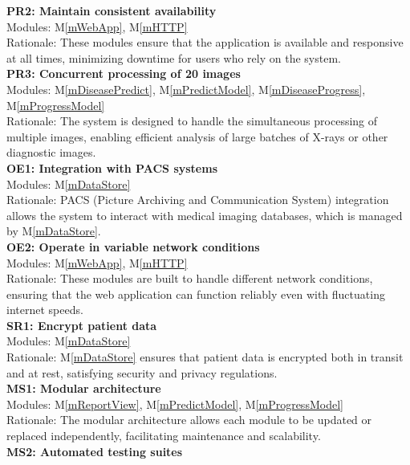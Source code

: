 \documentclass[12pt, titlepage]{article}
\newcommand{\mref}[1]{M\ref{#1}}
\begin{document}
\textbf{PR2: Maintain consistent availability} \\
Modules: \mref{mWebApp}, \mref{mHTTP} \\
Rationale: These modules ensure that the application is available and responsive at all times, minimizing downtime for users who rely on the system. \\
\newline
\textbf{PR3: Concurrent processing of 20 images} \\
Modules: \mref{mDiseasePredict}, \mref{mPredictModel}, \mref{mDiseaseProgress}, \mref{mProgressModel} \\
Rationale: The system is designed to handle the simultaneous processing of multiple images, enabling efficient analysis of large batches of X-rays or other diagnostic images. \\
\newline
\textbf{OE1: Integration with PACS systems} \\
Modules: \mref{mDataStore} \\
Rationale: PACS (Picture Archiving and Communication System) integration allows the system to interact with medical imaging databases, which is managed by \mref{mDataStore}. \\
\newline
\textbf{OE2: Operate in variable network conditions} \\
Modules: \mref{mWebApp}, \mref{mHTTP} \\
Rationale: These modules are built to handle different network conditions, ensuring that the web application can function reliably even with fluctuating internet speeds. \\
\newline
\textbf{SR1: Encrypt patient data} \\
Modules: \mref{mDataStore} \\
Rationale: \mref{mDataStore} ensures that patient data is encrypted both in transit and at rest, satisfying security and privacy regulations. \\
\newline
\textbf{MS1: Modular architecture} \\
Modules: \mref{mReportView}, \mref{mPredictModel}, \mref{mProgressModel} \\
Rationale: The modular architecture allows each module to be updated or replaced independently, facilitating maintenance and scalability. \\
\newline
\textbf{MS2: Automated testing suites} \\
\end{document}

